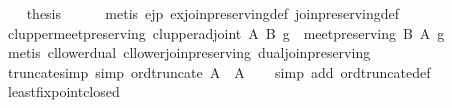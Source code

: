 \begin{isabellebody}
\ \ \isamarkupfalse%
\ {}thesis\isanewline
\ \ \ \ \isamarkupfalse%
\ {}metis\ ejp\ ex{}join{}preserving{}def\ join{}preserving{}def{}\isanewline
{}\isamarkupfalse%
%
\endisatagproof
{\isafoldproof}%
%
\isadelimproof
\isanewline
%
\endisadelimproof
\isanewline
{}\isamarkupfalse%
\ cl{}upper{}meet{}preserving{}\ {}cl{}upper{}adjoint\ A\ B\ g\ {}\ meet{}preserving\ B\ A\ g{}\isanewline
%
\isadelimproof
\ \ %
\endisadelimproof
%
\isatagproof
{}\isamarkupfalse%
\ {}metis\ cl{}lower{}dual\ cl{}lower{}join{}preserving\ dual{}join{}preserving{}%
\endisatagproof
{\isafoldproof}%
%
\isadelimproof
\isanewline
%
\endisadelimproof
\isanewline
\isanewline
\isanewline
{}\isamarkupfalse%
\ truncate{}simp\ {}simp{}{}\ {}ord{}truncate\ A\ {}\ A{}\isanewline
%
\isadelimproof
\ \ %
\endisadelimproof
%
\isatagproof
{}\isamarkupfalse%
\ {}simp\ add{}\ ord{}truncate{}def{}%
\endisatagproof
{\isafoldproof}%
%
\isadelimproof
\isanewline
%
\endisadelimproof
\isanewline
{}\isamarkupfalse%
\ least{}fixpoint{}closed{}\isanewline

\end{isabellebody}
